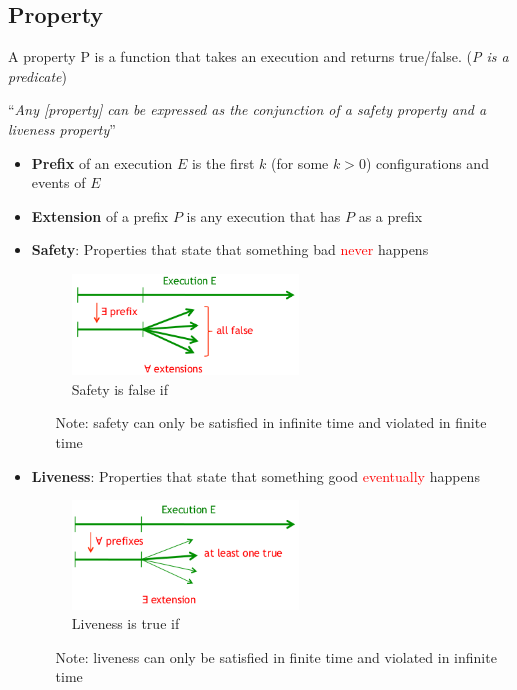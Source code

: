 \subsection{Property}

A property P is a function that takes an execution and returns
true/false. (\textit{P is a predicate})

\begin{center}
    \enquote{\textit{Any [property] can be expressed as the conjunction of a
    safety property and a liveness property}}
\end{center}

\begin{itemize}
    \item \textbf{Prefix} of an execution $E$ is the first $k$ (for
        some $k>0$) configurations and events of $E$
    \item \textbf{Extension} of a prefix $P$ is any execution
        that has $P$ as a prefix

    \item \textbf{Safety}: Properties that state that something bad \textcolor{red}{never}
        happens

        \begin{figure}[!ht]
            \centering
            \includegraphics[width=6cm]{img/safety.png}
            \caption{Safety is false if}
        \end{figure}
        \FloatBarrier{}

        \begin{itemize}
            \item[Note:] safety can only be satisfied in infinite time and violated in
                finite time
        \end{itemize}

    \item \textbf{Liveness}: Properties that state that something good
        \textcolor{red}{eventually} happens

        \begin{figure}[!ht]
            \centering
            \includegraphics[width=6cm]{img/liveness.png}
            \caption{Liveness is true if}
        \end{figure}
        \FloatBarrier{}

        \begin{itemize}
            \item[Note:] liveness can only be satisfied in finite time and violated in
                infinite time
        \end{itemize}
\end{itemize}


